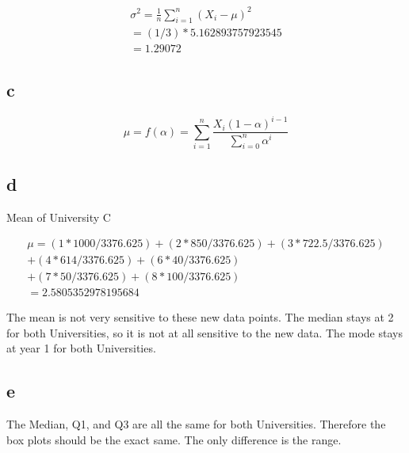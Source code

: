 \documentclass{article}
\begin{document}
\begin{multline*}
\sigma^2=\frac{1}{n}\sum_{i=1}^{n}(X_i-\mu)^2 \\
=(1/3)*5.162893757923545 \\
=1.29072
\end{multline*}

\subsection{c}
\begin{equation*}
\mu=f(\alpha)=\sum_{i=1}^{n}\frac{X_i(1-\alpha)^{i-1}}{\sum_{i=0}^{n}\alpha^i}
\end{equation*}

\newpage

\subsection{d} Mean of University C

\begin{multline*}
\mu=(1*1000/3376.625)+(2*850/3376.625)+(3*722.5/3376.625) \\
+(4*614/3376.625)+(6*40/3376.625) \\
+(7*50/3376.625)+(8*100/3376.625) \\
=2.5805352978195684
\end{multline*}

The mean is not very sensitive to these new data points. The median stays at 2 for both Universities, so it is not at all sensitive to the new data. The mode stays at year 1 for both Universities.

\subsection{e}
The Median, Q1, and Q3 are all the same for both Universities. Therefore the box plots should be the exact same.
The only difference is the range.

\end{document}
